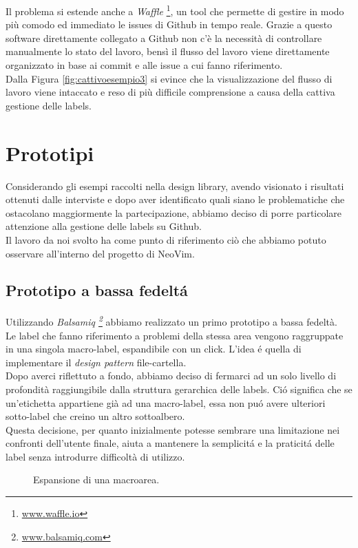\documentclass[12pt]{article} %
\begin{document}
Il problema si estende anche a \emph{Waffle} \footnote{\url{www.waffle.io}}, un tool che permette di gestire in modo pi\`u comodo ed immediato le issues di Github in tempo reale. Grazie a questo software direttamente collegato a Github non c'\`e la necessit\`a di controllare manualmente lo stato del lavoro, bensì il flusso del lavoro viene direttamente organizzato in base ai commit e alle issue a cui fanno riferimento.\\
Dalla Figura \ref{fig:cattivoesempio3} si evince che la visualizzazione del flusso di lavoro viene intaccato e reso di più difficile comprensione a causa della cattiva gestione delle labels. 
\newpage

\section{Prototipi}
Considerando gli esempi raccolti nella design library, avendo visionato i risultati ottenuti dalle interviste e dopo aver identificato quali siano le problematiche che ostacolano maggiormente la partecipazione, abbiamo deciso di porre particolare attenzione alla gestione delle labels su Github.\\
Il lavoro da noi svolto ha come punto di riferimento ci\`o che abbiamo potuto osservare all'interno del progetto di NeoVim.
\subsection{Prototipo a bassa fedelt\'a}
Utilizzando \emph{Balsamiq \footnote{\url{www.balsamiq.com}}} abbiamo realizzato un primo prototipo a bassa fedelt\`a.\\
Le label che fanno riferimento a problemi della stessa area vengono raggruppate in una singola macro-label, espandibile con un click. L'idea \'e quella di implementare il \emph{design pattern} file-cartella.\\ 
Dopo averci riflettuto a fondo, abbiamo deciso di fermarci ad un solo livello di profondit\`a raggiungibile dalla struttura gerarchica delle labels. Ci\'o significa che se un'etichetta appartiene gi\`a ad una macro-label, essa non pu\'o avere ulteriori sotto-label che creino un altro sottoalbero.\\
Questa decisione, per quanto inizialmente potesse sembrare una limitazione nei confronti dell'utente finale, aiuta a mantenere la semplicit\'a e la praticit\'a delle label senza introdurre difficolt\`a di utilizzo.

\begin{figure}[H] 
\caption{Espansione di una macroarea.}
\label{fig:low_prototype}
\end{figure}
\end{document}
